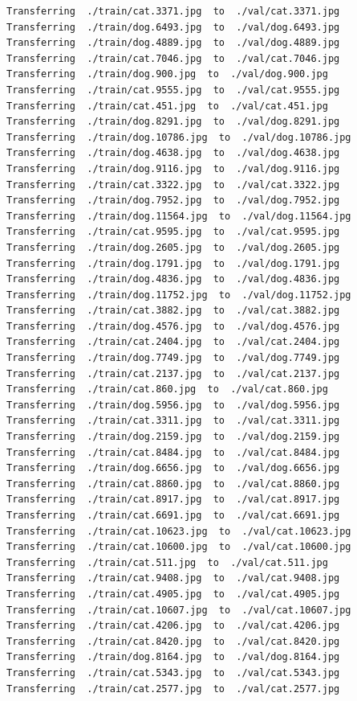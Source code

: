\documentclass[]{book}
\theoremstyle{definition}
\theoremstyle{definition}
\theoremstyle{definition}
\theoremstyle{remark}
\begin{document}
\begin{verbatim}
Transferring  ./train/cat.3371.jpg  to  ./val/cat.3371.jpg
Transferring  ./train/dog.6493.jpg  to  ./val/dog.6493.jpg
Transferring  ./train/dog.4889.jpg  to  ./val/dog.4889.jpg
Transferring  ./train/cat.7046.jpg  to  ./val/cat.7046.jpg
Transferring  ./train/dog.900.jpg  to  ./val/dog.900.jpg
Transferring  ./train/cat.9555.jpg  to  ./val/cat.9555.jpg
Transferring  ./train/cat.451.jpg  to  ./val/cat.451.jpg
Transferring  ./train/dog.8291.jpg  to  ./val/dog.8291.jpg
Transferring  ./train/dog.10786.jpg  to  ./val/dog.10786.jpg
Transferring  ./train/dog.4638.jpg  to  ./val/dog.4638.jpg
Transferring  ./train/dog.9116.jpg  to  ./val/dog.9116.jpg
Transferring  ./train/cat.3322.jpg  to  ./val/cat.3322.jpg
Transferring  ./train/dog.7952.jpg  to  ./val/dog.7952.jpg
Transferring  ./train/dog.11564.jpg  to  ./val/dog.11564.jpg
Transferring  ./train/cat.9595.jpg  to  ./val/cat.9595.jpg
Transferring  ./train/dog.2605.jpg  to  ./val/dog.2605.jpg
Transferring  ./train/dog.1791.jpg  to  ./val/dog.1791.jpg
Transferring  ./train/dog.4836.jpg  to  ./val/dog.4836.jpg
Transferring  ./train/dog.11752.jpg  to  ./val/dog.11752.jpg
Transferring  ./train/cat.3882.jpg  to  ./val/cat.3882.jpg
Transferring  ./train/dog.4576.jpg  to  ./val/dog.4576.jpg
Transferring  ./train/cat.2404.jpg  to  ./val/cat.2404.jpg
Transferring  ./train/dog.7749.jpg  to  ./val/dog.7749.jpg
Transferring  ./train/cat.2137.jpg  to  ./val/cat.2137.jpg
Transferring  ./train/cat.860.jpg  to  ./val/cat.860.jpg
Transferring  ./train/dog.5956.jpg  to  ./val/dog.5956.jpg
Transferring  ./train/cat.3311.jpg  to  ./val/cat.3311.jpg
Transferring  ./train/dog.2159.jpg  to  ./val/dog.2159.jpg
Transferring  ./train/cat.8484.jpg  to  ./val/cat.8484.jpg
Transferring  ./train/dog.6656.jpg  to  ./val/dog.6656.jpg
Transferring  ./train/cat.8860.jpg  to  ./val/cat.8860.jpg
Transferring  ./train/cat.8917.jpg  to  ./val/cat.8917.jpg
Transferring  ./train/cat.6691.jpg  to  ./val/cat.6691.jpg
Transferring  ./train/cat.10623.jpg  to  ./val/cat.10623.jpg
Transferring  ./train/cat.10600.jpg  to  ./val/cat.10600.jpg
Transferring  ./train/cat.511.jpg  to  ./val/cat.511.jpg
Transferring  ./train/cat.9408.jpg  to  ./val/cat.9408.jpg
Transferring  ./train/cat.4905.jpg  to  ./val/cat.4905.jpg
Transferring  ./train/cat.10607.jpg  to  ./val/cat.10607.jpg
Transferring  ./train/cat.4206.jpg  to  ./val/cat.4206.jpg
Transferring  ./train/cat.8420.jpg  to  ./val/cat.8420.jpg
Transferring  ./train/dog.8164.jpg  to  ./val/dog.8164.jpg
Transferring  ./train/cat.5343.jpg  to  ./val/cat.5343.jpg
Transferring  ./train/cat.2577.jpg  to  ./val/cat.2577.jpg

\end{verbatim}
\end{document}
